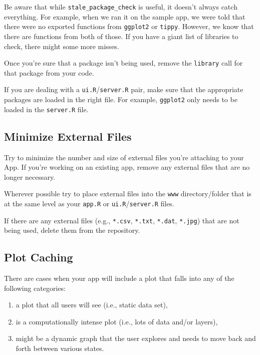 \documentclass[
]{book}
\providecommand{\tightlist}{%
  \setlength{\itemsep}{0pt}\setlength{\parskip}{0pt}}
\begin{document}
Be aware that while \texttt{stale\_package\_check} is useful, it doesn't always catch everything. For example, when we ran it on the sample app, we were told that there were no exported functions from \texttt{ggplot2} or \texttt{tippy}. However, we know that there are functions from both of those. If you have a giant list of libraries to check, there might some more misses.

Once you're sure that a package isn't being used, remove the \texttt{library} call for that package from your code.

If you are dealing with a \texttt{ui.R}/\texttt{server.R} pair, make sure that the appropriate packages are loaded in the right file. For example, \texttt{ggplot2} only needs to be loaded in the \texttt{server.R} file.

\hypertarget{exFiles}{%
\subsection{Minimize External Files}\label{exFiles}}

Try to minimize the number and size of external files you're attaching to your App. If you're working on an existing app, remove any external files that are no longer necessary.

Wherever possible try to place external files into the \texttt{www} directory/folder that is at the same level as your \texttt{app.R} or \texttt{ui.R}/\texttt{server.R} files.

If there are any external files (e.g., \texttt{*.csv}, \texttt{*.txt}, \texttt{*.dat}, \texttt{*.jpg}) that are not being used, delete them from the repository.

\hypertarget{plotCache}{%
\subsection{Plot Caching}\label{plotCache}}

There are cases when your app will include a plot that falls into any of the following categories:

\begin{enumerate}
\def\labelenumi{\arabic{enumi})}
\tightlist
\item
  a plot that all users will see (i.e., static data set),
\item
  is a computationally intense plot (i.e., lots of data and/or layers),
\item
  might be a dynamic graph that the user explores and needs to move back and forth between various states.
\end{enumerate}
\end{document}
